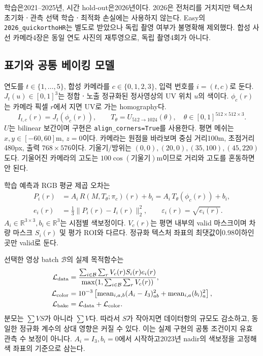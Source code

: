 \documentclass[11pt,a4paper]{article}
\newcommand{\mean}{\operatorname{mean}}
\newcommand{\calB}{\mathcal{B}}
\begin{document}
학습은2021--2025년, 시간 hold-out은2026년이다. 2026은 전처리를 거치지만 텍스처 초기화ㆍ관측 선택 학습ㆍ최적화 손실에는 사용하지 않는다. Easy의 \texttt{2026\_quickorthoHR}는 별도로 받았으나 독립 촬영 여부가 불명확해 제외했다. 합성 사선 카메라4장은 동일 연도 사진의 재투영으로, 독립 촬영4회가 아니다.

\subsection{표기와 공통 베이킹 모델}
연도를 $t\in\{1,\ldots,5\}$, 합성 카메라를 $c\in\{0,1,2,3\}$, 입력 번호를 $i=(t,c)$로 둔다. $J_t(u)\in[0,1]^3$는 정합ㆍ노출 정규화된 정사영상의 UV 위치 $u$의 색이다. $\phi_c(r)$는 카메라 픽셀 $r$에서 지면 UV로 가는 homography다.
\begin{equation}
 I_{t,c}(r)=J_t(\phi_c(r)),\qquad T_\theta=U_{512\to1024}(\theta),\quad
 \theta\in[0,1]^{512\times512\times3}.
\end{equation}
$U$는 bilinear 보간이며 구현은 \texttt{align\_corners=True}를 사용한다. 평면 메쉬는 $x,y\in[-60,60]$m, $z=0$이다. 카메라는 원점을 바라보며 중심 거리100m, 초점거리480px, 출력 $768\times576$이다. 기울기/방위는 $(0,0),(20,0),(35,100),(45,220)$도다. 기울어진 카메라의 고도는 $100\cos(\text{기울기})$m이므로 거리와 고도를 혼동하면 안 된다.

학습 예측과 RGB 평균 제곱 오차는
\begin{align}
 P_i(r)&=A_i\,R(M,T_\theta;\pi_c)(r)+b_i
        =A_i\,T_\theta(\phi_c(r))+b_i,\\
 e_i(r)&=\frac{1}{3}\|P_i(r)-I_i(r)\|_2^2,\qquad
 \varepsilon_i(r)=\sqrt{e_i(r)}.
\end{align}
$A_i\in\mathbb R^{3\times3},b_i\in\mathbb R^3$는 시점별 색보정이다. $V_c(r)$는 평면 내부의 valid 마스크이며 차량 마스크 $S_i(r)$ 및 평가 ROI와 다르다. 정규화 텍스처 좌표의 최댓값이0.98이하인 곳만 valid로 둔다.

선택한 영상 batch $\calB$의 실제 목적함수는
\begin{align}
 \mathcal L_{\rm data}
 &=\frac{\sum_{i\in\calB}\sum_r V_c(r)S_i(r)e_i(r)}
         {\max(1,\sum_{i\in\calB}\sum_r V_c(r))},\label{eq:data}\\
 \mathcal L_{\rm color}
 &=10^{-3}\left[\mean_{i,a,b}(A_i-I_3)_{ab}^2+
                       \mean_{i,a}(b_i)_a^2\right],\\
 \mathcal L_{\rm bake}&=\mathcal L_{\rm data}+\mathcal L_{\rm color}.
\end{align}
분모는 $\sum VS$가 아니라 $\sum V$다. 따라서 $S$가 작아지면 데이터항의 규모도 감소하고, 동일한 정규화 계수의 상대 영향은 커질 수 있다. 이는 실제 구현의 공통 조건이지 유효 관측 수 보정이 아니다. $A_i=I_3,b_i=0$에서 시작하고2023년 nadir의 색보정을 고정해 색 좌표의 기준으로 삼는다.
\end{document}
